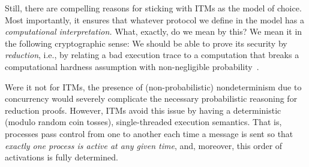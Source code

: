 Still, there are compelling reasons for sticking with ITMs as the model of
choice. Most importantly, it ensures that whatever protocol we define in the
model has a \emph{computational interpretation.} What, exactly, do we mean by
this? We mean it in the following cryptographic sense: We should be able to
prove its security by \emph{reduction}, i.e., by relating a bad execution trace
to a computation that breaks a computational hardness assumption with
non-negligible probability~\cite{lindell2014introduction}.

Were it not for ITMs, the presence of (non-probabilistic) nondeterminism due to
concurrency would severely complicate the necessary probabilistic reasoning for
reduction proofs. However, ITMs avoid this issue by having a deterministic
(modulo random coin tosses), single-threaded execution semantics. That is,
processes pass control from one to another each time a message is sent so that
\emph{exactly one process is active at any given time}, and, moreover, this
order of activations is fully determined.



